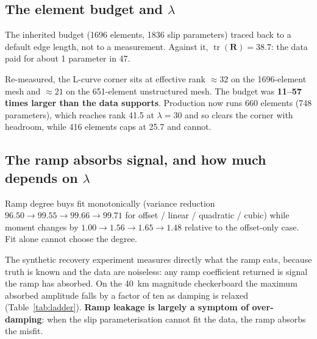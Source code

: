 \documentclass[11pt,a4paper]{article}
\newcommand{\R}{\mathbf{R}}
\begin{document}
\subsection{The element budget and \texorpdfstring{$\lambda$}{lambda}}

The inherited budget (1696 elements, 1836 slip parameters) traced back to a
default edge length, not to a measurement. Against it, $\operatorname{tr}(\R) =
38.7$: the data paid for about 1 parameter in 47.

Re-measured, the L-curve corner sits at effective rank $\approx 32$ on the
1696-element mesh and $\approx 21$ on the 651-element unstructured mesh. The
budget was \textbf{11--57 times larger than the data supports}. Production now
runs 660 elements (748 parameters), which reaches rank 41.5 at $\lambda = 30$ and
so clears the corner with headroom, while 416 elements caps at 25.7 and cannot.

\subsection{The ramp absorbs signal, and how much depends on \texorpdfstring{$\lambda$}{lambda}}
\label{sec:ramp}

Ramp degree buys fit monotonically (variance reduction $96.50 \to 99.55 \to 99.66
\to 99.71$ for offset / linear / quadratic / cubic) while moment changes by
$1.00 \to 1.56 \to 1.65 \to 1.48$ relative to the offset-only case. Fit alone
cannot choose the degree.

The synthetic recovery experiment measures directly what the ramp eats, because
truth is known and the data are noiseless: any ramp coefficient returned is
signal the ramp has absorbed. On the 40~km magnitude checkerboard the maximum
absorbed amplitude falls by a factor of ten as damping is relaxed
(Table~\ref{tab:ladder}). \textbf{Ramp leakage is largely a symptom of
over-damping}: when the slip parameterisation cannot fit the data, the ramp
absorbs the misfit.
\end{document}
